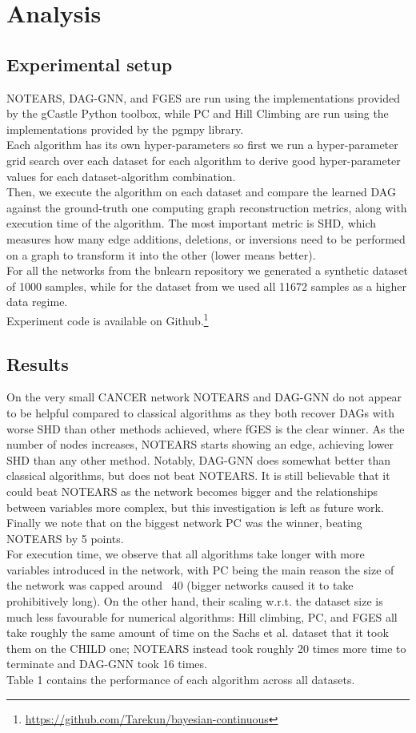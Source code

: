 \documentclass[letterpaper]{article}
\let\savedcite\cite
\let\cite\savedcite
\begin{document}
\section{Analysis}

\subsection{Experimental setup}
NOTEARS, DAG-GNN, and FGES are run using the implementations provided by the gCastle
Python toolbox, while PC and Hill Climbing are run using the
implementations provided by the pgmpy library.\\
Each algorithm has its own
hyper-parameters so first we run a hyper-parameter grid search over each dataset for each algorithm
to derive good hyper-parameter values for each dataset-algorithm combination.\\
Then, we execute the algorithm on each dataset and compare the learned DAG against the ground-truth one
computing graph reconstruction metrics, along with execution time of the algorithm. The most important 
metric is SHD, which measures how many edge additions, deletions, or
inversions need to be performed on a graph to transform it into the other (lower means better).\\
For all the networks from the bnlearn repository we generated a
synthetic dataset of 1000 samples, while for the dataset from \cite{sachs2005causal} we used
all 11672 samples as a higher data regime.\\
Experiment code is available on Github.\footnote{\url{https://github.com/Tarekun/bayesian-continuous}}

\subsection{Results}
On the very small CANCER network NOTEARS and DAG-GNN do not appear to be helpful compared to classical
algorithms as they both recover DAGs with worse SHD than other methods achieved, where fGES is
the clear winner.
As the number of nodes increases, NOTEARS starts showing an edge, achieving lower SHD than any other 
method. Notably, DAG-GNN does somewhat better than
classical algorithms, but does not beat NOTEARS. It is still believable that it could beat
NOTEARS as the network becomes bigger and the relationships between variables more complex, but this
investigation is left as future work. Finally we note that on the biggest network PC was the winner,
beating NOTEARS by 5 points.\\
For execution time, we observe that all algorithms take longer with more variables introduced
in the network, with PC being the main reason the size of the network was capped around ~40 (bigger
networks caused it to take prohibitively long).
On the other hand, their scaling w.r.t. the dataset size is much less favourable for numerical algorithms:
Hill climbing, PC, and FGES all take roughly the same amount of time on 
the Sachs et al. dataset that it took them on
the CHILD one; NOTEARS instead took roughly 20 times more time to terminate and DAG-GNN took 16 times.\\
Table 1 contains the performance of each algorithm across all datasets.
\end{document}
